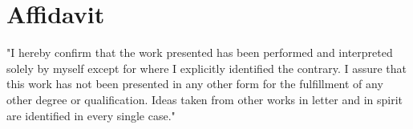 \section*{Affidavit}
\vspace*{1.0cm}
"I  hereby confirm that the  work  presented  has  been  performed  and interpreted solely by myself except for where I explicitly identified the contrary. I assure that this work has not been presented in any other form for the fulfillment of any other degree or qualification. Ideas taken from other works in letter and in spirit are identified in every single case."
